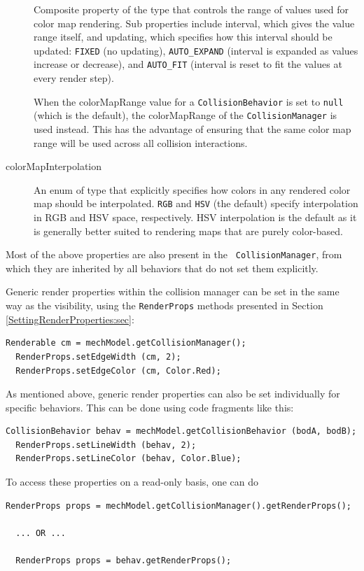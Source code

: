 \begin{description}
Composite property of the type
 that controls the range
of values used for color map rendering. Sub properties include {\sf
interval}, which gives the value range itself, and {\sf updating},
which specifies how this interval should be updated: {\tt FIXED} (no
updating), {\tt AUTO\_EXPAND} (interval is expanded as values increase
or decrease), and {\tt AUTO\_FIT} (interval is reset to fit the values
at every render step).

When the {\sf colorMapRange} value for a {\tt CollisionBehavior} is
set to {\tt null} (which is the default), the {\sf colorMapRange} of
the {\tt CollisionManager} is used instead. This has the advantage of
ensuring that the same color map range will be used across all
collision interactions.

\item[colorMapInterpolation]\mbox{}

An enum of type
 that explicitly
specifies how colors in any rendered color map should be interpolated.
{\tt RGB} and {\tt HSV} (the default) specify interpolation in RGB and
HSV space, respectively. HSV interpolation is the default as it is
generally better suited to rendering maps that are purely color-based.

\end{description}

Most of the above properties are also present in the {\tt
CollisionManager}, from which they are inherited by all behaviors that
do not set them explicitly.

Generic render properties within the collision manager can be
set in the same way as the visibility, using the {\tt RenderProps}
methods presented in Section \ref{SettingRenderProperties:sec}:
\begin{lstlisting}[]
  Renderable cm = mechModel.getCollisionManager();
  RenderProps.setEdgeWidth (cm, 2);
  RenderProps.setEdgeColor (cm, Color.Red);
\end{lstlisting}

As mentioned above, generic render properties can also be set
individually for specific behaviors. This can be done using code
fragments like this:
\begin{lstlisting}[]
  CollisionBehavior behav = mechModel.getCollisionBehavior (bodA, bodB);
  RenderProps.setLineWidth (behav, 2);
  RenderProps.setLineColor (behav, Color.Blue);
\end{lstlisting}
To access these properties on a read-only basis, one can do
\begin{lstlisting}[]
  RenderProps props = mechModel.getCollisionManager().getRenderProps();

  ... OR ...

  RenderProps props = behav.getRenderProps();
\end{lstlisting}

